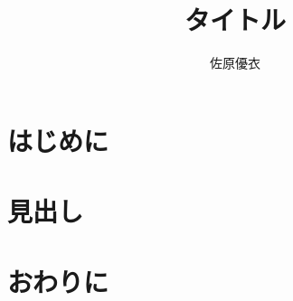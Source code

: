 \documentclass{jsarticle}
\begin{document}
\title{タイトル}
\author{佐原優衣}
\maketitle

\section{はじめに}
\section{見出し}
\section{おわりに}
\end{document}
